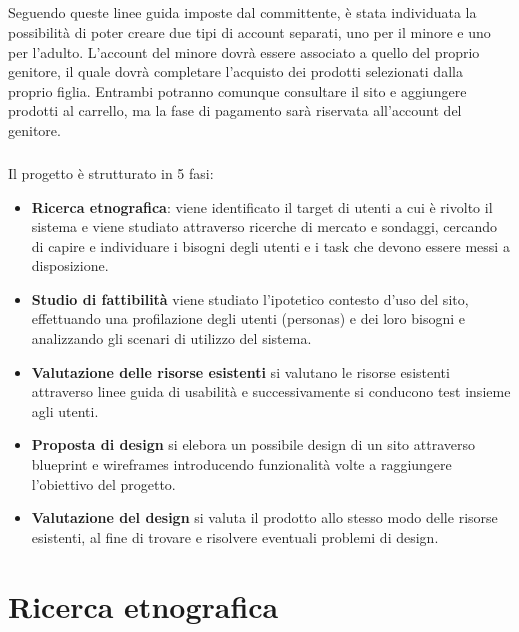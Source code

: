 \documentclass[12pt,a4paper]{report}
\begin{document}
\paragraph{} Seguendo queste linee guida imposte dal committente, è stata individuata la possibilità di poter creare due tipi di account separati, uno per il minore e uno per l'adulto. L'account del minore dovrà essere associato a quello del proprio genitore, il quale dovrà completare l'acquisto dei prodotti selezionati dalla proprio figlia. Entrambi potranno comunque consultare il sito e aggiungere prodotti al carrello, ma la fase di pagamento sarà riservata all'account del genitore.
\paragraph{} Il progetto è strutturato in 5 fasi:
\begin{itemize}
  \item \textbf{Ricerca etnografica}: viene identificato il target di utenti a cui è rivolto il sistema e viene studiato attraverso ricerche di mercato e sondaggi, cercando di capire e individuare i bisogni degli utenti e i task che devono essere messi a disposizione.
  \item \textbf{Studio di fattibilità} viene studiato l'ipotetico contesto d'uso del sito, effettuando una profilazione degli utenti (personas) e dei loro bisogni e analizzando gli scenari di utilizzo del sistema.
  \item \textbf{Valutazione delle risorse esistenti} si valutano le risorse esistenti attraverso linee guida di usabilità e successivamente si conducono test insieme agli utenti.
  \item \textbf{Proposta di design} si elebora un possibile design di un sito attraverso blueprint e wireframes introducendo funzionalità volte a raggiungere l'obiettivo del progetto.
  \item \textbf{Valutazione del design} si valuta il prodotto allo stesso modo delle risorse esistenti, al fine di trovare e risolvere eventuali problemi di design.
\end{itemize}
\chapter{Ricerca etnografica}
\end{document}
